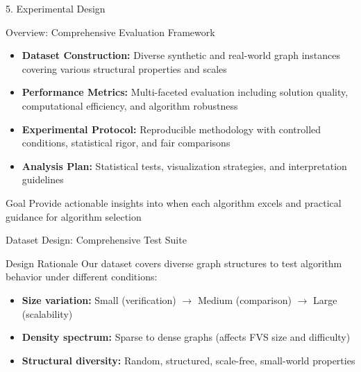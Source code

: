 \documentclass[aspectratio=169]{beamer}
\begin{document}
\begin{frame}{5. Experimental Design}
	\begin{block}{Overview: Comprehensive Evaluation Framework}
		\begin{itemize}
			\item \textbf{Dataset Construction:} Diverse synthetic and real-world graph instances covering various structural properties and scales
			\item \textbf{Performance Metrics:} Multi-faceted evaluation including solution quality, computational efficiency, and algorithm robustness
			\item \textbf{Experimental Protocol:} Reproducible methodology with controlled conditions, statistical rigor, and fair comparisons
			\item \textbf{Analysis Plan:} Statistical tests, visualization strategies, and interpretation guidelines
		\end{itemize}
	\end{block}
	
	\vspace{0.2cm}
	\begin{alertblock}{Goal}
		Provide actionable insights into when each algorithm excels and practical guidance for algorithm selection
	\end{alertblock}
\end{frame}

\begin{frame}{Dataset Design: Comprehensive Test Suite}
	\begin{block}{Design Rationale}
		Our dataset covers diverse graph structures to test algorithm behavior under different conditions:
		\begin{itemize}
			\item \textbf{Size variation:} Small (verification) $\rightarrow$ Medium (comparison) $\rightarrow$ Large (scalability)
			\item \textbf{Density spectrum:} Sparse to dense graphs (affects FVS size and difficulty)
			\item \textbf{Structural diversity:} Random, structured, scale-free, small-world properties
		\end{itemize}
	\end{block}
	
	
\end{frame}
\end{document}
